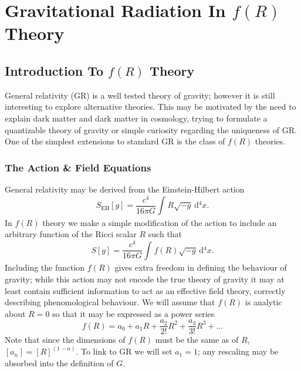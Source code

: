 \documentclass[a4paper, 11pt, titlepage, twoside]{report}
\newcommand{\sub}[1]{\ensuremath{_\mathrm{#1}}}
\newcommand{\dd}{\ensuremath{\mathrm{d}}}
\newcommand{\intd}[4]{\ensuremath{\int_{#1}^{#2}{#3}\,\dd{#4}}}
\begin{document}
\chapter{Gravitational Radiation In $f(R)$ Theory}

\section{Introduction To $f(R)$ Theory}

General relativity (GR) is a well tested theory of gravity\cite{Will2006}; however it is still interesting to explore alternative theories. This may be motivated by the need to explain dark matter and dark matter in cosmology, trying to formulate a quantizable theory of gravity or simple curiosity regarding the uniqueness of GR. One of the simplest extensions to standard GR is the class of $f(R)$ theories\cite{Sotiriou2010, DeFelice2010}.

\subsection{The Action \& Field Equations}

General relativity may be derived from the Einstein-Hilbert action\cite{Misner1973, Landau1975}
\begin{equation}
S\sub{EH}[g] = \frac{c^4}{16\pi G}\intd{}{}{R\sqrt{-g}}{^4x}.
\end{equation}
In $f(R)$ theory we make a simple modification of the action to include an arbitrary function of the Ricci scalar $R$ such that\cite{Buchdahl1970}
\begin{equation}
S[g] = \frac{c^4}{16\pi G}\intd{}{}{f(R)\sqrt{-g}}{^4x}.
\end{equation}
Including the function $f(R)$ gives extra freedom in defining the behaviour of gravity; while this action may not encode the true theory of gravity it may at least contain sufficient information to act as an effective field theory, correctly describing phenomological behaviour\cite{Park2010}. We will assume that $f(R)$ is analytic about $R = 0$ so that it may be expressed as a power series\cite{Buchdahl1970, Psaltis2008}
\begin{equation}
f(R) = a_0 + a_1 R + \frac{a_2}{2!}R^2 + \frac{a_3}{3!}R^3 + \ldots
\end{equation}
Note that since the dimensions of $f(R)$ must be the same as of $R$, $[a_n] = [R]^{(1-n)}$. To link to GR we will set $a_1 = 1$; any rescaling may be absorbed into the definition of $G$.
\end{document}
